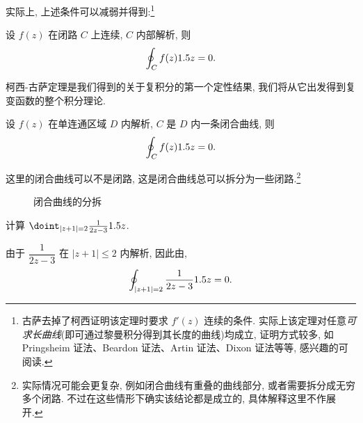 实际上, 上述条件可以减弱并得到:\footnote{
  古萨去掉了柯西证明该定理时要求 $f'(z)$ 连续的条件.
  实际上该定理对任意\emph{可求长曲线}(即可通过黎曼积分得到其长度的曲线)均成立, 证明方式较多, 如 Pringsheim 证法、Beardon 证法、Artin 证法、Dixon 证法等等, 感兴趣的可阅读\cite{Ahlfors2022,FanHe1987,ShiLiu1998,ZhuangZhang1984}.
}
\begin{theorem}[柯西-古萨定理]\label{thm:Cauchy-Goursat}
  设 $f(z)$ 在闭路 $C$ 上连续, $C$ 内部解析, 则
  \[
    \oint_C f(z)1.5 z=0.
  \]
\end{theorem}

柯西-古萨定理是我们得到的关于复积分的第一个定性结果, 我们将从它出发得到复变函数的整个积分理论.

\begin{corollary}
  设 $f(z)$ 在单连通区域 $D$ 内解析, $C$ 是 $D$ 内一条闭合曲线, 则
  \[
    \oint_C f(z)1.5 z=0.
  \]
\end{corollary}

这里的闭合曲线可以不是闭路, 这是闭合曲线总可以拆分为一些闭路.\footnote{
  实际情况可能会更复杂, 例如闭合曲线有重叠的曲线部分, 或者需要拆分成无穷多个闭路.
  不过在这些情形下确实该结论都是成立的, 具体解释这里不作展开.
}

\begin{figure}[!htb]
  \centering
  \caption{闭合曲线的分拆}
\end{figure}



\begin{example}
  计算 $\doint_{|z+1|=2}\frac1{2z-3}\d z$.
\end{example}

\begin{solution}
  由于 $\dfrac1{2z-3}$ 在 $|z+1|\le 2$ 内解析,
  因此由\thmCG,
  \[
    \oint_{|z+1|=2}\frac1{2z-3}1.5 z=0.
  \]
\end{solution}

